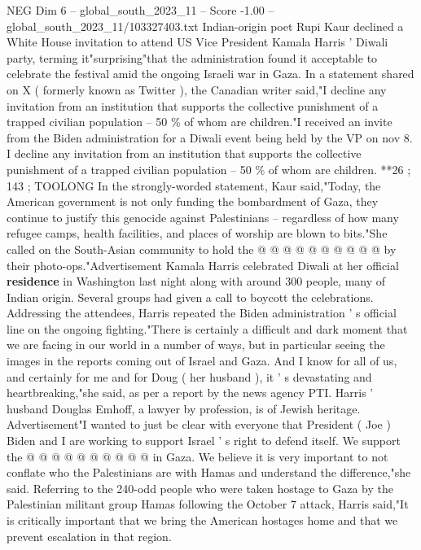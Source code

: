 \begin{textsample}{NEG Dim 6 – global\_south\_2023\_11 – Score -1.00 – global\_south\_2023\_11/103327403.txt}  \label{ex:f6_neg_152}
Indian-origin poet Rupi Kaur declined a White House invitation to attend US Vice President Kamala Harris ' Diwali party, terming it"surprising"that the administration found it acceptable to celebrate the festival amid the ongoing Israeli war in Gaza.
In a statement shared on X ( formerly known as Twitter ), the Canadian writer said,"I decline any invitation from an institution that supports the collective punishment of a trapped civilian population -- 50 \% of whom are children."I received an invite from the Biden administration for a Diwali event being held by the VP on nov 8.
I decline any invitation from an institution that supports the collective punishment of a trapped civilian population -- 50 \% of whom are children. **26 ; 143 ; TOOLONG In the strongly-worded statement, Kaur said,"Today, the American government is not only funding the bombardment of Gaza, they continue to justify this genocide against Palestinians -- regardless of how many refugee camps, health facilities, and places of worship are blown to bits."She called on the South-Asian community to hold the @ @ @ @ @ @ @ @ @ @ by their photo-ops."Advertisement Kamala Harris celebrated Diwali at her official \textbf{residence} in Washington last night along with around 300 people, many of Indian origin.
Several groups had given a call to boycott the celebrations.
Addressing the attendees, Harris repeated the Biden administration ' s official line on the ongoing fighting."There is certainly a difficult and dark moment that we are facing in our world in a number of ways, but in particular seeing the images in the reports coming out of Israel and Gaza.
And I know for all of us, and certainly for me and for Doug ( her husband ), it ' s devastating and heartbreaking,"she said, as per a report by the news agency PTI.
Harris ' husband Douglas Emhoff, a lawyer by profession, is of Jewish heritage.
Advertisement"I wanted to just be clear with everyone that President ( Joe ) Biden and I are working to support Israel ' s right to defend itself.
We support the @ @ @ @ @ @ @ @ @ @ in Gaza.
We believe it is very important to not conflate who the Palestinians are with Hamas and understand the difference,"she said.
Referring to the 240-odd people who were taken hostage to Gaza by the Palestinian militant group Hamas following the October 7 attack, Harris said,"It is critically important that we bring the American hostages home and that we prevent escalation in that region.

\end{textsample}
